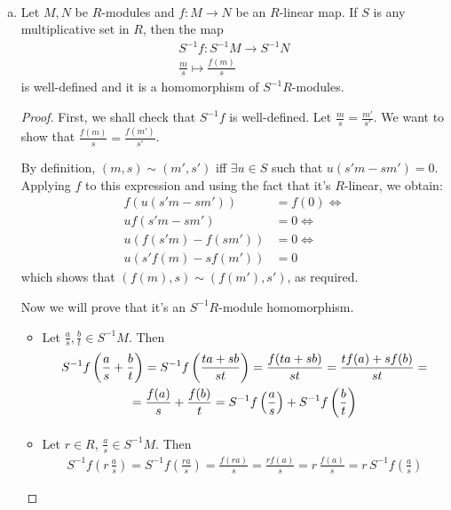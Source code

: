\begin{problem*}{6}
~
\begin{enumerate}[(a)]
    \item Let \(M, N\) be \(R\)-modules and \(f \colon M \to N\) be an \(R\)-linear map. If \(S\) is any multiplicative set in \(R\), then the map
    \begin{gather*}
        S^{-1} f \colon S^{-1} M \to S^{-1} N \\
        \frac{m}{s} \mapsto \frac{f(m)}{s}
    \end{gather*}
    is well-defined and it is a homomorphism of \(S^{-1} R\)-modules.
    
    \begin{proof}
    First, we shall check that \(S^{-1} f\) is well-defined. Let \(\frac{m}{s} = \frac{m'}{s'}\). We want to show that \(\frac{f(m)}{s} = \frac{f(m')}{s'}\).
    
    By definition, \((m, s) \sim (m', s')\) iff \(\exists u \in S\) such that \(u (s'm - sm') = 0\). Applying \(f\) to this expression and using the fact that it's \(R\)-linear, we obtain:
    \begin{align*}
        f(u(s'm - sm')) &= f(0) \iff \\
        u f(s'm - sm') &= 0 \iff \\
        u (f(s'm) - f(sm')) &= 0 \iff \\
        u (s' f(m) - s f(m')) &= 0
    \end{align*}
    which shows that \((f(m), s) \sim (f(m'), s')\), as required.
    
    Now we will prove that it's an \(S^{-1}R\)-module homomorphism.
    \begin{itemize}
        \item Let \(\frac{a}{s}, \frac{b}{t} \in S^{-1} M\). Then
        \begin{gather*}
            S^{-1}f\left(\frac{a}{s} + \frac{b}{t}\right)
            = S^{-1} f\left(\frac{t a + s b}{st}\right)
            = \frac{f(ta + sb)}{st}
            = \frac{tf(a) + sf(b)}{st} = \\
            \smallskip
            = \frac{f(a)}{s} + \frac{f(b)}{t}
            = S^{-1} f \left(\frac{a}{s}\right) + S^{-1} f \left(\frac{b}{t}\right)
        \end{gather*}
        
        \item Let \(r \in R\), \(\frac{a}{s} \in S^{-1} M\). Then
        \begin{gather*}
            S^{-1} f \left(r \, \frac{a}{s}\right) = S^{-1} f \left(\frac{ra}{s}\right) = \frac{f(ra)}{s} = \frac{r f(a)}{s} = r \, \frac{f(a)}{s} = r \, S^{-1} f \left(\frac{a}{s}\right)
        \end{gather*}
    \end{itemize}
    \end{proof}
    

\end{enumerate}
\end{problem*}
